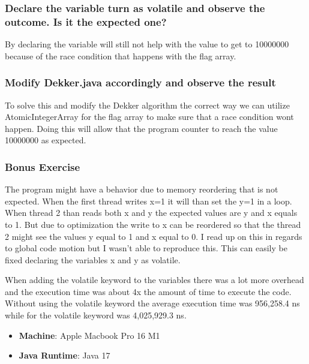 \documentclass{article}
\begin{document}
\subsubsection*{Declare the variable turn as volatile and observe the outcome. Is it the expected one?}
By declaring the variable will still not help with the value to get to 10000000 because of the race condition that happens with the flag array.

\subsubsection*{Modify Dekker.java accordingly and observe the result}
To solve this and modify the Dekker algorithm the correct way we can utilize AtomicIntegerArray for the flag array to make sure that a race condition wont happen. Doing this will allow that the program counter to reach the value 10000000 as expected.

\subsubsection*{Bonus Exercise}
The program might have a behavior due to memory reordering that is not expected. When the first thread writes x=1 it will than set the y=1 in a loop. When thread 2 than reads both x and y the expected values are y and x equals to 1. But due to optimization the write to x can be reordered so that the thread 2 might see the values y equal to 1 and x equal to 0. I read up on this in regards to global code motion but I wasn't able to reproduce this. This can easily be fixed declaring the variables x and y as volatile.

When adding the volatile keyword to the variables there was a lot more overhead and the execution time was about 4x the amount of time to execute the code. Without using the volatile keyword the average execution time was 956,258.4 ns while for the volatile keyword was 4,025,929.3 ns.

\begin{itemize}
    \item \textbf{Machine}: Apple Macbook Pro 16 M1
    \item \textbf{Java Runtime}: Java 17
\end{itemize}





\newpage
\printbibliography
\end{document}
